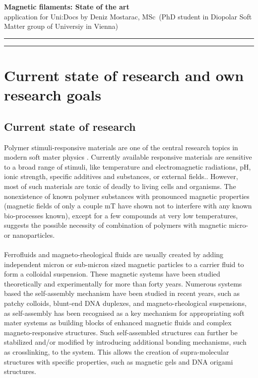 \documentclass{article}
\newcommand{\soptitle}{\textbf{Magnetic filaments: State of the art}}
\newcommand{\yourname}{Deniz Mostarac, MSc}
\begin{document}
\begin{center}\LARGE\soptitle\\
\large application for Uni:Docs by \yourname\ (PhD student in Diopolar Soft Matter group of Universiy in Vienna)
\end{center}

\textcolor{NavyBlue}{\hrule height 2pt}
\vspace{1pt}
\textcolor{NavyBlue}{\hrule height 4pt}


\section[colour=blue]{Current state of research and own research goals}
\subsection{Current state of research}
Polymer stimuli-responsive materials are one of the central research topics in modern soft mater physics \cite{balazs2006nanoparticle,hu2010responsive}. Currently available responsive materials are sensitive to a broad range of stimuli, like temperature and electromagnetic radiations,\cite{jochum2013temperature} pH,\cite{dai2008ph} ionic strength,\cite{magnusson2008ion} specific additives and substances,\cite{ulijn2006enzyme} or external fields.\cite{roy2011biological}. However, most of such materials are toxic of deadly to living cells and organisms. The nonexistence of known polymer substances with pronounced magnetic properties (magnetic fields of only a couple mT have shown not to interfere with any known bio-processes known), except for a few compounds at very low temperatures,\cite{rajca2001magnetic,kamachi2002magnetic,blundell2004organic} suggests the possible necessity of combination of polymers with magnetic micro- or nanoparticles.\cite{thevenot2013magnetic}\\\\
Ferrofluids and magneto-rheological fluids are usually created by adding independent micron or sub-micron sized magnetic particles to a carrier fluid to form a colloidal suspension. These magnetic systems have been studied theoretically and experimentally for more than forty years.\cite{holm2005structure,sanchez2015effect,de2011magnetorheological} Numerous systems based the self-assembly mechanism have been studied in recent years, such as patchy colloids,\cite{bianchi2011inverse,preisler2014equilibrium,smallenburg2014erasing} blunt-end DNA duplexes,\cite{nakata2007end,zanchetta2010right,kantorovich2013calculate,rovigatti2014gels} and magneto-rheological suspensions,\cite{shulman1986structure,park2010magnetorheology} as self-assembly has been recognised as a key mechanism for appropriating soft mater systems as building blocks of enhanced magnetic fluids and complex magneto-responsive structures. Such self-assembled structures can further be stabilized and/or modified by introducing additional bonding mechanisms, such as crosslinking, to the system. This allows the creation of supra-molecular structures with specific properties, such as magnetic gels \cite{frank1993voltage,zrinyi1998kinetics,Weeber_2012} and DNA origami structures.\cite{Rothemund_2006,Pal_2010,Zadegan_2012} \\\\
\end{document}

